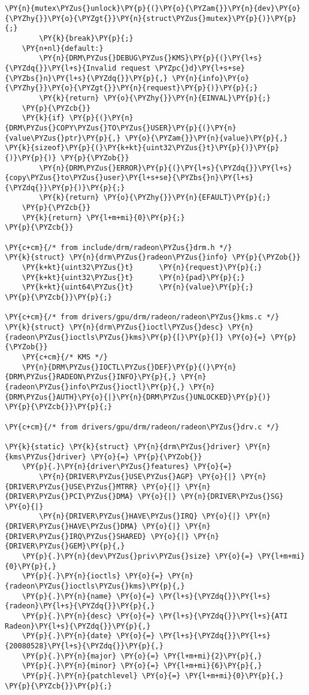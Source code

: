 \begin{Verbatim}[commandchars=\\\{\}]
		\PY{n}{mutex\PYZus{}unlock}\PY{p}{(}\PY{o}{\PYZam{}}\PY{n}{dev}\PY{o}{\PYZhy{}}\PY{o}{\PYZgt{}}\PY{n}{struct\PYZus{}mutex}\PY{p}{)}\PY{p}{;}
		\PY{k}{break}\PY{p}{;}
	\PY{n+nl}{default:}
		\PY{n}{DRM\PYZus{}DEBUG\PYZus{}KMS}\PY{p}{(}\PY{l+s}{\PYZdq{}}\PY{l+s}{Invalid request \PYZpc{}d}\PY{l+s+se}{\PYZbs{}n}\PY{l+s}{\PYZdq{}}\PY{p}{,} \PY{n}{info}\PY{o}{\PYZhy{}}\PY{o}{\PYZgt{}}\PY{n}{request}\PY{p}{)}\PY{p}{;}
		\PY{k}{return} \PY{o}{\PYZhy{}}\PY{n}{EINVAL}\PY{p}{;}
	\PY{p}{\PYZcb{}}
	\PY{k}{if} \PY{p}{(}\PY{n}{DRM\PYZus{}COPY\PYZus{}TO\PYZus{}USER}\PY{p}{(}\PY{n}{value\PYZus{}ptr}\PY{p}{,} \PY{o}{\PYZam{}}\PY{n}{value}\PY{p}{,} \PY{k}{sizeof}\PY{p}{(}\PY{k+kt}{uint32\PYZus{}t}\PY{p}{)}\PY{p}{)}\PY{p}{)} \PY{p}{\PYZob{}}
		\PY{n}{DRM\PYZus{}ERROR}\PY{p}{(}\PY{l+s}{\PYZdq{}}\PY{l+s}{copy\PYZus{}to\PYZus{}user}\PY{l+s+se}{\PYZbs{}n}\PY{l+s}{\PYZdq{}}\PY{p}{)}\PY{p}{;}
		\PY{k}{return} \PY{o}{\PYZhy{}}\PY{n}{EFAULT}\PY{p}{;}
	\PY{p}{\PYZcb{}}
	\PY{k}{return} \PY{l+m+mi}{0}\PY{p}{;}
\PY{p}{\PYZcb{}}

\PY{c+cm}{/* from include/drm/radeon\PYZus{}drm.h */}
\PY{k}{struct} \PY{n}{drm\PYZus{}radeon\PYZus{}info} \PY{p}{\PYZob{}}
	\PY{k+kt}{uint32\PYZus{}t}		\PY{n}{request}\PY{p}{;}
	\PY{k+kt}{uint32\PYZus{}t}		\PY{n}{pad}\PY{p}{;}
	\PY{k+kt}{uint64\PYZus{}t}		\PY{n}{value}\PY{p}{;}
\PY{p}{\PYZcb{}}\PY{p}{;}

\PY{c+cm}{/* from drivers/gpu/drm/radeon/radeon\PYZus{}kms.c */}
\PY{k}{struct} \PY{n}{drm\PYZus{}ioctl\PYZus{}desc} \PY{n}{radeon\PYZus{}ioctls\PYZus{}kms}\PY{p}{[}\PY{p}{]} \PY{o}{=} \PY{p}{\PYZob{}}
	\PY{c+cm}{/* KMS */}
	\PY{n}{DRM\PYZus{}IOCTL\PYZus{}DEF}\PY{p}{(}\PY{n}{DRM\PYZus{}RADEON\PYZus{}INFO}\PY{p}{,} \PY{n}{radeon\PYZus{}info\PYZus{}ioctl}\PY{p}{,} \PY{n}{DRM\PYZus{}AUTH}\PY{o}{|}\PY{n}{DRM\PYZus{}UNLOCKED}\PY{p}{)}
\PY{p}{\PYZcb{}}\PY{p}{;}

\PY{c+cm}{/* from drivers/gpu/drm/radeon/radeon\PYZus{}drv.c */}

\PY{k}{static} \PY{k}{struct} \PY{n}{drm\PYZus{}driver} \PY{n}{kms\PYZus{}driver} \PY{o}{=} \PY{p}{\PYZob{}}
	\PY{p}{.}\PY{n}{driver\PYZus{}features} \PY{o}{=}
	    \PY{n}{DRIVER\PYZus{}USE\PYZus{}AGP} \PY{o}{|} \PY{n}{DRIVER\PYZus{}USE\PYZus{}MTRR} \PY{o}{|} \PY{n}{DRIVER\PYZus{}PCI\PYZus{}DMA} \PY{o}{|} \PY{n}{DRIVER\PYZus{}SG} \PY{o}{|}
	    \PY{n}{DRIVER\PYZus{}HAVE\PYZus{}IRQ} \PY{o}{|} \PY{n}{DRIVER\PYZus{}HAVE\PYZus{}DMA} \PY{o}{|} \PY{n}{DRIVER\PYZus{}IRQ\PYZus{}SHARED} \PY{o}{|} \PY{n}{DRIVER\PYZus{}GEM}\PY{p}{,}
	\PY{p}{.}\PY{n}{dev\PYZus{}priv\PYZus{}size} \PY{o}{=} \PY{l+m+mi}{0}\PY{p}{,}
	\PY{p}{.}\PY{n}{ioctls} \PY{o}{=} \PY{n}{radeon\PYZus{}ioctls\PYZus{}kms}\PY{p}{,}
	\PY{p}{.}\PY{n}{name} \PY{o}{=} \PY{l+s}{\PYZdq{}}\PY{l+s}{radeon}\PY{l+s}{\PYZdq{}}\PY{p}{,}
	\PY{p}{.}\PY{n}{desc} \PY{o}{=} \PY{l+s}{\PYZdq{}}\PY{l+s}{ATI Radeon}\PY{l+s}{\PYZdq{}}\PY{p}{,}
	\PY{p}{.}\PY{n}{date} \PY{o}{=} \PY{l+s}{\PYZdq{}}\PY{l+s}{20080528}\PY{l+s}{\PYZdq{}}\PY{p}{,}
	\PY{p}{.}\PY{n}{major} \PY{o}{=} \PY{l+m+mi}{2}\PY{p}{,}
	\PY{p}{.}\PY{n}{minor} \PY{o}{=} \PY{l+m+mi}{6}\PY{p}{,}
	\PY{p}{.}\PY{n}{patchlevel} \PY{o}{=} \PY{l+m+mi}{0}\PY{p}{,}
\PY{p}{\PYZcb{}}\PY{p}{;}


\end{Verbatim}
